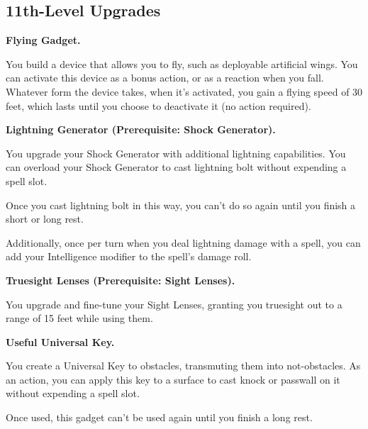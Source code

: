 \documentclass[11pt,twoside,openany]{book}  %
\begin{document}
\subsection{11th-Level Upgrades}
\begin{fiveitemize}

	\item \textbf{Flying Gadget.}
	
	You build a device that allows you to fly, such as deployable artificial wings. You can activate this device as a bonus action, or as a reaction when you fall. Whatever form the device takes, when it’s activated, you gain a flying speed of 30 feet, which lasts until you choose to deactivate it (no action required).

	\item \textbf{Lightning Generator (Prerequisite: Shock Generator).}
	
	You upgrade your Shock Generator with additional lightning capabilities. You can overload your Shock Generator to cast lightning bolt without expending a spell slot.

	Once you cast lightning bolt in this way, you can’t do so again until you finish a short or long rest.

	Additionally, once per turn when you deal lightning damage with a spell, you can add your Intelligence modifier to the spell’s damage roll.

	\item \textbf{Truesight Lenses (Prerequisite: Sight Lenses).}
	
	You upgrade and fine-tune your Sight Lenses, granting you truesight out to a range of 15 feet while using them.

	\item \textbf{Useful Universal Key.}
	
	You create a Universal Key to obstacles, transmuting them into not-obstacles. As an action, you can apply this key to a surface to cast knock or passwall on it without expending a spell slot.

	Once used, this gadget can’t be used again until you finish a long rest.
\end{fiveitemize}
\end{document}
